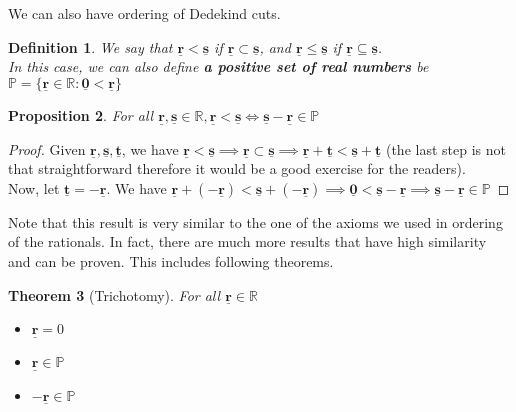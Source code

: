 \documentclass{book}
\newtheorem{theorem}{Theorem}[section]
\newtheorem{definition}[theorem]{Definition}
\newtheorem{proposition}[theorem]{Proposition}
\begin{document}
We can also have ordering of Dedekind cuts.

\begin{definition}
    We say that $\underline{\mathbf{r}} < \underline{\mathbf{s}}$ if $\underline{\mathbf{r}} \subset \underline{\mathbf{s}}$, and $\underline{\mathbf{r}} \leq \underline{\mathbf{s}}$ if $\underline{\mathbf{r}} \subseteq \underline{\mathbf{s}}$. \\
    In this case, we can also define \textbf{a positive set of real numbers} be $\mathbb{P} = \{ \underline{\mathbf{r}} \in \mathbb{R}: \underline{\mathbf{0}} < \underline{\mathbf{r}} \}$
\end{definition}

\begin{proposition}
    For all $\underline{\mathbf{r}}, \underline{\mathbf{s}} \in \mathbb{R}, \underline{\mathbf{r}} < \underline{\mathbf{s}} \iff \underline{\mathbf{s}} - \underline{\mathbf{r}} \in \mathbb{P}$
\end{proposition}

\begin{proof}
    Given $\underline{\mathbf{r}}, \underline{\mathbf{s}}, \underline{\mathbf{t}}$, we have $\underline{\mathbf{r}} < \underline{\mathbf{s}} \implies \underline{\mathbf{r}} \subset \underline{\mathbf{s}} \implies \underline{\mathbf{r}} + \underline{\mathbf{t}} < \underline{\mathbf{s}} + \underline{\mathbf{t}}$ (the last step is not that straightforward therefore it would be a good exercise for the readers). \\
    Now, let $\underline{\mathbf{t}} = -\underline{\mathbf{r}}$. We have $\underline{\mathbf{r}} + (- \underline{\mathbf{r}}) < \underline{\mathbf{s}} + (- \underline{\mathbf{r}}) \implies \underline{\mathbf{0}} < \underline{\mathbf{s}} - \underline{\mathbf{r}} \implies \underline{\mathbf{s}} - \underline{\mathbf{r}} \in \mathbb{P}$
\end{proof}

Note that this result is very similar to the one of the axioms we used in ordering of the rationals. In fact, there are much more results that have high similarity and can be proven. This includes following theorems.

\begin{theorem}[Trichotomy]
    For all $\underline{\mathbf{r}} \in \mathbb{R}$
    \begin{itemize}
        \item[(1)] $\underline{\mathbf{r}} = 0$
        \item[(2)] $\underline{\mathbf{r}} \in \mathbb{P}$
        \item[(3)] $-\underline{\mathbf{r}} \in \mathbb{P}$
    \end{itemize}
\end{theorem}
\end{document}
